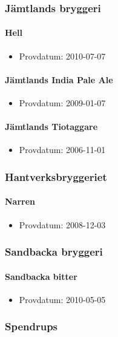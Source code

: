\documentclass[11pt]{article}
\begin{document}
\subsubsection{Jämtlands bryggeri}
\label{sec:org8c2826d}
\paragraph{Hell}
\label{sec:org90ead1f}
\begin{itemize}
\item Provdatum: 2010-07-07
\end{itemize}
\paragraph{Jämtlands India Pale Ale}
\label{sec:orgc21ba43}
\begin{itemize}
\item Provdatum: 2009-01-07
\end{itemize}
\paragraph{Jämtlands Tiotaggare}
\label{sec:orgf6ab785}
\begin{itemize}
\item Provdatum: 2006-11-01
\end{itemize}
\subsubsection{Hantverksbryggeriet}
\label{sec:orgf6fbdff}
\paragraph{Narren}
\label{sec:org6986a90}
\begin{itemize}
\item Provdatum: 2008-12-03
\end{itemize}
\subsubsection{Sandbacka bryggeri}
\label{sec:org3fd985e}
\paragraph{Sandbacka bitter}
\label{sec:org36c70a7}
\begin{itemize}
\item Provdatum: 2010-05-05
\end{itemize}
\subsubsection{Spendrups}
\label{sec:org3777f0a}
\end{document}
